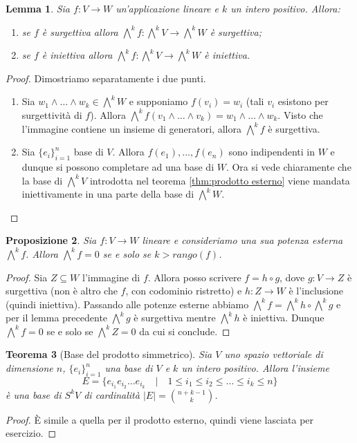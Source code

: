 \documentclass[11pt]{article}
\theoremstyle{plain}
\newtheorem{thm}{Teorema}[section]
\newtheorem{lemma}[thm]{Lemma}
\newtheorem{prop}[thm]{Proposizione}
\theoremstyle{definition}
\theoremstyle{remark}
\begin{document}
\begin{lemma}
Sia $f:V\to W$ un'applicazione lineare e $k$ un intero positivo. Allora:
\begin{enumerate}
\item se $f$ è surgettiva allora $\bigwedge^k f:\bigwedge^kV\to \bigwedge^kW$ è surgettiva;
\item se $f$ è iniettiva allora $\bigwedge^k f:\bigwedge^kV\to \bigwedge^kW$ è iniettiva.
\end{enumerate}
\end{lemma}
\begin{proof}
Dimostriamo separatamente i due punti.
\begin{enumerate}
\item Sia $w_1\wedge\dots\wedge w_k\in \bigwedge^kW$ e supponiamo $f(v_i) = w_i$ (tali $v_i$ esistono per surgettività di $f$).
Allora $\bigwedge^kf(v_1\wedge\dots\wedge v_k) = w_1\wedge\dots\wedge w_k$. Visto che l'immagine contiene un insieme di generatori, allora $\bigwedge^kf$ è surgettiva.
\item Sia $\{e_i\}_{i=1}^n$ base di $V$. Allora $f(e_1),\dots,f(e_n)$ sono indipendenti in $W$ e dunque si possono completare ad una base di $W$.
Ora si vede chiaramente che la base di $\bigwedge^kV$ introdotta nel teorema \ref{thm:prodotto esterno} viene mandata iniettivamente in una parte
della base di $\bigwedge^kW$.
\end{enumerate}
\end{proof}
\begin{prop}
Sia $f:V\to W$ lineare e consideriamo una sua potenza esterna $\bigwedge^kf$. Allora $\bigwedge^kf=0$ se e solo se $k>rango(f)$.
\end{prop}
\begin{proof}
Sia $Z\subseteq W$ l'immagine di $f$. Allora posso scrivere $f = h\circ g$, dove $g:V\to Z$ è surgettiva (non è altro che $f$, con codominio ristretto)
e $h:Z\to W$ è l'inclusione (quindi iniettiva). Passando alle potenze esterne abbiamo $\bigwedge^kf = \bigwedge^k h \circ \bigwedge^k g$ e per
il lemma precedente $\bigwedge^k g$ è surgettiva mentre $\bigwedge^k h$ è iniettiva.
Dunque $\bigwedge^kf = 0$ se e solo se $\bigwedge^kZ=0$ da cui si conclude.
\end{proof}

\begin{thm}[Base del prodotto simmetrico]
Sia $V$ uno spazio vettoriale di dimensione $n$, $\{e_i\}_{i=1}^n$ una base di $V$ e $k$ un intero positivo.
Allora l'insieme
\[E=\{e_{i_1}e_{i_2}\ldots e_{i_k} \quad|\quad 1 \leq i_1 \leq i_2 \leq\ldots\leq i_k \leq n\}\]
è una base di $S^k V$ di cardinalità $|E|= \binom {n+k-1}{k}$.
\label{thm:prodotto simmetrico}
\end{thm}
\begin{proof}
\`E simile a quella per il prodotto esterno, quindi viene lasciata per esercizio.
\end{proof}
\end{document}
